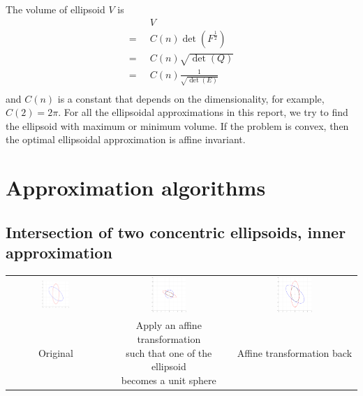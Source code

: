 \documentclass{article}
\begin{document}
The volume of ellipsoid $V$ is 
\begin{align*}
&\;\;V\\
= &\;\; C(n) \det(F^{\frac{1}{2}})\\
= &\;\; C(n) \sqrt{\det(Q)}\\
= &\;\; C(n) \frac{1}{\sqrt{\det(E)}}\\
\end{align*}
and $C(n)$ is a constant that depends on the dimensionality, for example, $C(2) = 2\pi$. For all the ellipsoidal approximations in this report, we try to find the ellipsoid with maximum or minimum volume. If the problem is convex, then the optimal ellipsoidal approximation is affine invariant.

\section{Approximation algorithms}

\subsection{Intersection of two concentric ellipsoids, inner approximation}
\begin{table}[H]
\centering
\begin{tabular}{ccc}
\includegraphics[width=0.3\textwidth]{intersect_concentric_ia/1.pdf} & \includegraphics[width=0.3\textwidth]{intersect_concentric_ia/2.pdf} & \includegraphics[width=0.3\textwidth]{intersect_concentric_ia/3.pdf}\\
Original & \makecell{Apply an affine transformation \\such that one of the ellipsoid \\becomes a unit sphere} & Affine transformation back
\end{tabular}
\label{intersect_concentric_ia}
\end{table}
    
\end{document}
